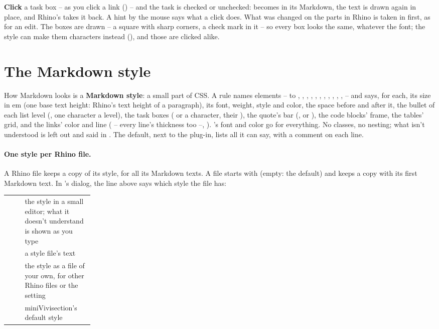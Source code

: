 \textbf{Click} a task box -- as you click a link () -- and the task is checked or
unchecked: \code{- [ ]} becomes \code{- [x]} in its Markdown, the text is drawn again in place, and Rhino's 
takes it back. A hint by the mouse says what a click does. What was changed on the parts in Rhino is taken in first, as
for an edit. The boxes are drawn -- a square with sharp corners, a check mark in it -- so every box looks the same,
whatever the font; the style can make them characters instead (), and those are clicked alike.

\section{The Markdown style}\label{sec:mdstyle}

How Markdown looks is a \textbf{Markdown style}: a small part of CSS. A rule names elements --  to ,
, , , , , , , , ,
,  -- and says, for each, its size in em (one base text height: Rhino's text height of a
paragraph), its font, weight, style and color, the space before and after it, the bullet of each list level
(, one character a level), the task boxes ( or a character, their
), the quote's bar (,  or ), the code blocks' frame, the tables' grid,
and the links' color and line ( -- every line's thickness too --, ). 's font and
color go for everything. No classes, no nesting; what isn't understood is left out and said in . The default,
 next to the plug-in, lists all it can say, with a comment on each line.

\paragraph{One style per Rhino file.} A Rhino file keeps a copy of its style, for all its Markdown texts. A file starts
with  (empty: the default) and keeps a copy with its first Markdown text. In
's dialog, the line above  says which style the file has:

\begin{xltabular}{\linewidth}{@{}P{0.2\linewidth}L@{}}
\toprule
{} & the style in a small editor; what it doesn't understand is shown as you type \\
       & a style file's text \\
    & the style as a file of your own, for other Rhino files or the setting \\
       & miniVivisection's default style \\
\bottomrule
\end{xltabular}

